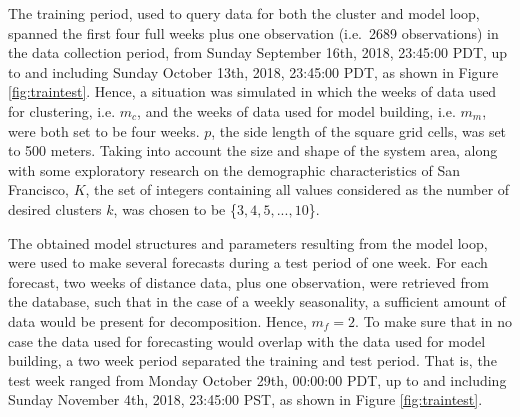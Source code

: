\documentclass[12pt,oneside]{reedthesis}
\begin{document}
The training period, used to query data for both the cluster and model
loop, spanned the first four full weeks plus one observation (i.e.~2689
observations) in the data collection period, from Sunday September 16th,
2018, 23:45:00 PDT, up to and including Sunday October 13th, 2018,
23:45:00 PDT, as shown in Figure \ref{fig:traintest}. Hence, a situation
was simulated in which the weeks of data used for clustering, i.e.
\(m_{c}\), and the weeks of data used for model building, i.e.
\(m_{m}\), were both set to be four weeks. \(p\), the side length of the
square grid cells, was set to 500 meters. Taking into account the size
and shape of the system area, along with some exploratory research on
the demographic characteristics of San Francisco, \(K\), the set of
integers containing all values considered as the number of desired
clusters \(k\), was chosen to be \{\(3, 4, 5, ..., 10\)\}.

The obtained model structures and parameters resulting from the model
loop, were used to make several forecasts during a test period of one
week. For each forecast, two weeks of distance data, plus one
observation, were retrieved from the database, such that in the case of
a weekly seasonality, a sufficient amount of data would be present for
decomposition. Hence, \(m_{f} = 2\). To make sure that in no case the
data used for forecasting would overlap with the data used for model
building, a two week period separated the training and test period. That
is, the test week ranged from Monday October 29th, 00:00:00 PDT, up to
and including Sunday November 4th, 2018, 23:45:00 PST, as shown in
Figure \ref{fig:traintest}.
\end{document}
